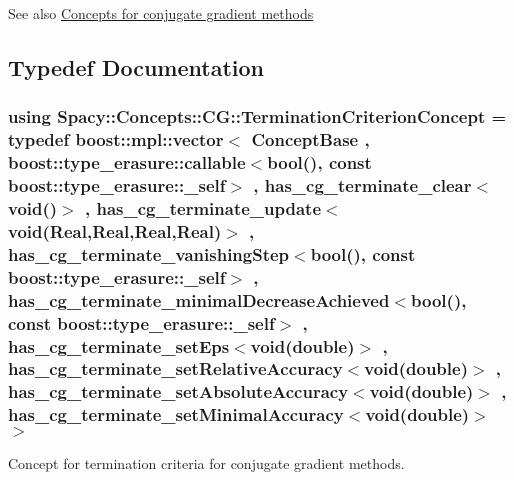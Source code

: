 \begin{DoxySeeAlso}{See also}
\hyperlink{group__CGConceptGroup}{Concepts for conjugate gradient methods} 
\end{DoxySeeAlso}


\subsection{Typedef Documentation}
\hypertarget{group__CGConceptGroup_ga6b30d103c365816efcfb038d922aef07_ga6b30d103c365816efcfb038d922aef07}{}
\subsubsection[{Termination\+Criterion\+Concept}]{\setlength{\rightskip}{0pt plus 5cm}using {\bf Spacy\+::\+Concepts\+::\+C\+G\+::\+Termination\+Criterion\+Concept} = typedef boost\+::mpl\+::vector$<$ {\bf Concept\+Base} , boost\+::type\+\_\+erasure\+::callable$<$bool(), const boost\+::type\+\_\+erasure\+::\+\_\+self$>$ , has\+\_\+cg\+\_\+terminate\+\_\+clear$<$void()$>$ , has\+\_\+cg\+\_\+terminate\+\_\+update$<$void({\bf Real},{\bf Real},{\bf Real},{\bf Real})$>$ , has\+\_\+cg\+\_\+terminate\+\_\+vanishing\+Step$<$bool(), const boost\+::type\+\_\+erasure\+::\+\_\+self$>$ , has\+\_\+cg\+\_\+terminate\+\_\+minimal\+Decrease\+Achieved$<$bool(), const boost\+::type\+\_\+erasure\+::\+\_\+self$>$ , has\+\_\+cg\+\_\+terminate\+\_\+set\+Eps$<$void(double)$>$ , has\+\_\+cg\+\_\+terminate\+\_\+set\+Relative\+Accuracy$<$void(double)$>$ , has\+\_\+cg\+\_\+terminate\+\_\+set\+Absolute\+Accuracy$<$void(double)$>$ , has\+\_\+cg\+\_\+terminate\+\_\+set\+Minimal\+Accuracy$<$void(double)$>$ $>$}\label{group__CGConceptGroup_ga6b30d103c365816efcfb038d922aef07_ga6b30d103c365816efcfb038d922aef07}


Concept for termination criteria for conjugate gradient methods. 

